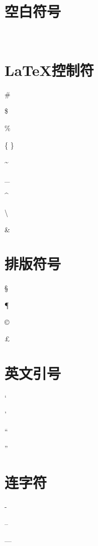 \documentclass[a4paper, oneside]{article}
\begin{document}
	\section{空白符号}
		\ 	%
	\section{\LaTeX 控制符}
		\#

		\$

		\%

		\{ \}

		\~{}

		\_{}

		\^{}

		\textbackslash

		\&
	\section{排版符号}
		\S

		\P

		\dag

		\ddag

		\copyright

		\pounds
	\section{英文引号}
		`	%

		'	%

		``	%

		''
	\section{连字符}
		-

		--

		---
\end{document}
